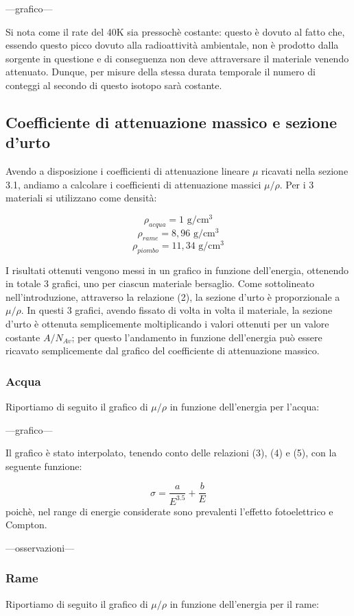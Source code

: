 \documentclass[a4paper,10pt]{article}
\newcommand*{\unit}[1]{\ensuremath{\mathrm{\,#1}}}
\begin{document}
---grafico---

Si nota come il rate del 40K sia pressochè costante: questo è dovuto al fatto che, essendo questo picco dovuto alla radioattività ambientale, non è prodotto dalla sorgente in questione e di conseguenza non deve attraversare il materiale venendo attenuato. Dunque, per misure della stessa durata temporale il numero di conteggi al secondo di questo isotopo sarà costante.

\subsection{Coefficiente di attenuazione massico e sezione d'urto}
Avendo a disposizione i coefficienti di attenuazione lineare $\mu$ ricavati nella sezione 3.1, andiamo a calcolare i coefficienti di attenuazione massici $\mu/\rho$. Per i 3 materiali si utilizzano come densità:

$$
	\rho_{acqua} = 1\, \unit{g/cm^3}
$$
$$
	\rho_{rame} = 8,96\, \unit{g/cm^3}
$$
$$
	\rho_{piombo} = 11,34\, \unit{g/cm^3}
$$

I risultati ottenuti vengono messi in un grafico in funzione dell'energia, ottenendo in totale 3 grafici, uno per ciascun materiale bersaglio. Come sottolineato nell'introduzione, attraverso la relazione (2), la sezione d'urto è proporzionale a $\mu/\rho$. In questi 3 grafici, avendo fissato di volta in volta il materiale, la sezione d'urto è ottenuta semplicemente moltiplicando i valori ottenuti per un valore costante $A/N_{Av}$; per questo l'andamento in funzione dell'energia può essere ricavato semplicemente dal grafico del coefficiente di attenuazione massico.

\subsubsection{Acqua}
Riportiamo di seguito il grafico di $\mu/\rho$ in funzione dell'energia per l'acqua:

---grafico---

Il grafico è stato interpolato, tenendo conto delle relazioni (3), (4) e (5), con la seguente funzione:

\begin{equation}
	\sigma = \frac{a}{E^{3.5}} + \frac{b}{E}
\end{equation}
poichè, nel range di energie considerate sono prevalenti l'effetto fotoelettrico e Compton. 

---osservazioni---

\subsubsection{Rame}
Riportiamo di seguito il grafico di $\mu/\rho$ in funzione dell'energia per il rame:
\end{document}
